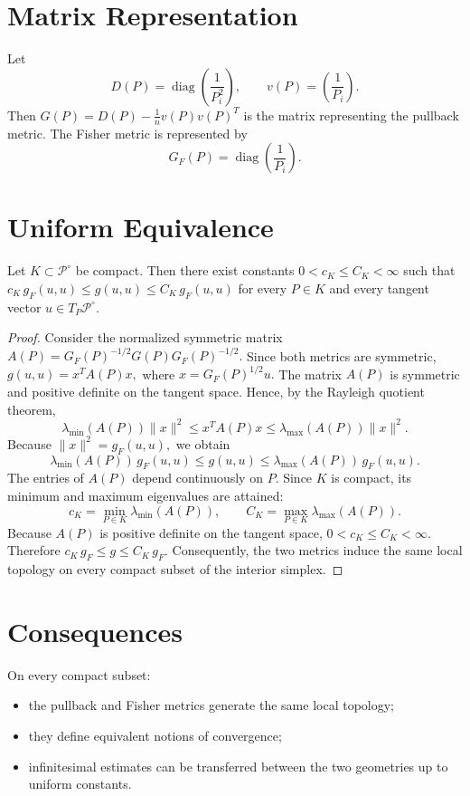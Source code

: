 \section{Matrix Representation}
Let
\[
D(P)=\operatorname{diag}\!\left(\frac1{P_i^2}\right),
\qquad v(P)=\left(\frac1{P_i}\right).
\]
Then
$G(P) = D(P)-\frac1n v(P)v(P)^T$
is the matrix representing the pullback metric.
The Fisher metric is represented by
\[
G_F(P)=\operatorname{diag}\!\left(\frac1{P_i}\right).
\]
\section{Uniform Equivalence}
\begin{theorem}
\label{ch:thm:25-3}
Let \(K\subset\mathcal P^\circ\) be compact.
Then there exist constants
$0<c_K\le C_K<\infty$
such that
$c_K\,g_F(u,u) \le g(u,u) \le C_K\,g_F(u,u)$
for every \(P\in K\) and every tangent vector
\(u\in T_P\mathcal P^\circ\).
\end{theorem}
\begin{proof}
Consider the normalized symmetric matrix
$A(P) = G_F(P)^{-1/2} G(P) G_F(P)^{-1/2}.$
Since both metrics are symmetric,
$g(u,u) = x^T A(P) x,$
where
$x = G_F(P)^{1/2}u.$
The matrix \(A(P)\) is symmetric and positive definite on the tangent
space. Hence, by the Rayleigh quotient theorem,
\[ \lambda_{\min}(A(P)) \|x\|^2 \le x^T A(P) x
\le \lambda_{\max}(A(P)) \|x\|^2. \]
Because
$\|x\|^2 = g_F(u,u),$
we obtain
\[ \lambda_{\min}(A(P))\,g_F(u,u) \le g(u,u)
\le \lambda_{\max}(A(P))\,g_F(u,u). \]
The entries of \(A(P)\) depend continuously on \(P\). Since \(K\) is compact,
its minimum and maximum eigenvalues are attained:
\[ c_K =
\min_{P\in K}\lambda_{\min}(A(P)),
\qquad C_K =
\max_{P\in K}\lambda_{\max}(A(P)). \]
Because \(A(P)\) is positive definite on the tangent space,
$0<c_K\le C_K<\infty.$
Therefore
$c_K\,g_F \le g \le C_K\,g_F.$
Consequently, the two metrics induce the same local topology on every
compact subset of the interior simplex. 
\end{proof}
\section{Consequences}
\begin{corollary}
\label{ch:cor:25-4}
On every compact subset:
\begin{itemize}
\item the pullback and Fisher metrics generate the same local topology;
\item they define equivalent notions of convergence;
\item infinitesimal estimates can be transferred between the two
    geometries up to uniform constants.
\end{itemize}
\end{corollary}
